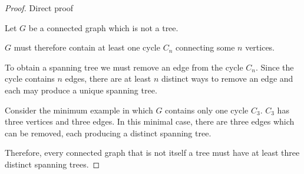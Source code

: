 \documentclass[11pt, letterpaper, includehead]{article}
\theoremstyle{plain}
\theoremstyle{mydefinition}
\theoremstyle{myproperty}
\begin{document}
\begin{enumerate}[label=\textbf{\arabic*}., leftmargin=*]
    \begin{proof} Direct proof

        Let $G$ be a connected graph which is not a tree.

        $G$ must therefore contain at least one cycle $C_n$ connecting some $n$ vertices.  

        To obtain a spanning tree we must remove an edge from the cycle $C_n$. Since the cycle contains $n$ edges, there are at least $n$ distinct ways to remove an edge and each may produce a unique spanning tree.

        Consider the minimum example in which $G$ contains only one cycle $C_3$. $C_3$ has three vertices and three edges. In this minimal case, there are three edges which can be removed, each producing a distinct spanning tree. 

        Therefore, every connected graph that is not itself a tree must have at least three distinct spanning trees.
    \end{proof}

\end{enumerate}
\end{document}
